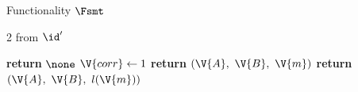 \begin{interface}[nofloat]{Functionality $\Fsmt$ \\
}
{\begin{multicols}{2}
 \quad from $\id'$
\begin{algorithmic}[1]
\algcont
{}
  \State \textbf{return} $\none$
\EndIf
{}
  \State $\V{corr} \gets 1$ \label{ln:smtexposed}
  \State \textbf{return} $(\V{A},\ \V{B},\ \V{m})$ \label{ln:smtplain}
\EndIf
\State \textbf{return} $(\V{A},\ \V{B},\ l(\V{m}))$ \label{ln:smtoutsider}
\algsave
\end{algorithmic}
\end{multicols}}
\end{interface}
